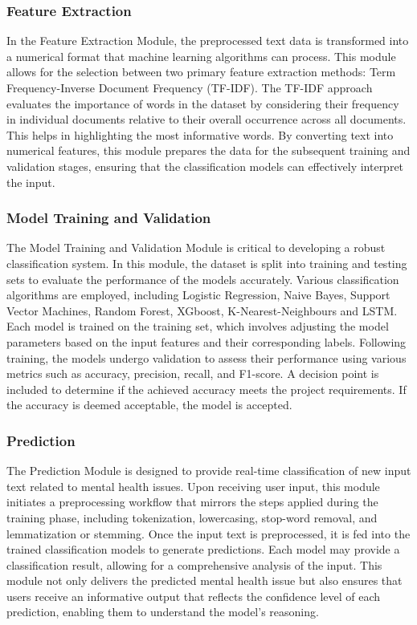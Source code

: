 \subsubsection{Feature Extraction}
\noindent
In the Feature Extraction Module, the preprocessed text data is transformed into a numerical format that machine learning algorithms can process. This module allows for the selection between two primary feature extraction methods: Term Frequency-Inverse Document Frequency (TF-IDF). The TF-IDF approach evaluates the importance of words in the dataset by considering their frequency in individual documents relative to their overall occurrence across all documents. This helps in highlighting the most informative words. By converting text into numerical features, this module prepares the data for the subsequent training and validation stages, ensuring that the classification models can effectively interpret the input.

\subsubsection{Model Training and Validation}
\noindent
The Model Training and Validation Module is critical to developing a robust classification system. In this module, the dataset is split into training and testing sets to evaluate the performance of the models accurately. Various classification algorithms are employed, including Logistic Regression, Naive Bayes, Support Vector Machines, Random Forest, XGboost, K-Nearest-Neighbours and LSTM. Each model is trained on the training set, which involves adjusting the model parameters based on the input features and their corresponding labels. Following training, the models undergo validation to assess their performance using various metrics such as accuracy, precision, recall, and F1-score. A decision point is included to determine if the achieved accuracy meets the project requirements. If the accuracy is deemed acceptable, the model is accepted. 

\subsubsection{Prediction}
\noindent
The Prediction Module is designed to provide real-time classification of new input text related to mental health issues. Upon receiving user input, this module initiates a preprocessing workflow that mirrors the steps applied during the training phase, including tokenization, lowercasing, stop-word removal, and lemmatization or stemming. Once the input text is preprocessed, it is fed into the trained classification models to generate predictions. Each model may provide a classification result, allowing for a comprehensive analysis of the input. This module not only delivers the predicted mental health issue but also ensures that users receive an informative output that reflects the confidence level of each prediction, enabling them to understand the model's reasoning.

